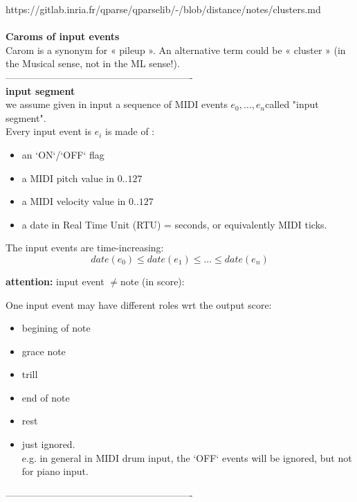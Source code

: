https://gitlab.inria.fr/qparse/qparselib/-/blob/distance/notes/clusters.md\\\\

\textbf{Caroms of input events}\\

Carom is a synonym for « pileup ». An alternative term could be « cluster » (in the Musical sense, not in the ML sense!).\\

----------------------------------------------------------\\

\textbf{input segment}\\

we assume given in input a sequence of MIDI events $e_0, \ldots, e_n$​​ called "input segment".\\

Every input event is $e_i$ is made of :
\begin{itemize}
	\item an `ON`/`OFF` flag
	\item a MIDI pitch value in $0..127$​
	\item a MIDI velocity value in $0..127$
	\item a date in Real Time Unit (RTU) = seconds, or equivalently MIDI ticks.\\
\end{itemize}

The input events are time-increasing:
$$ date(e_0) \leq  date(e_1) \leq \ldots \leq date(e_n)$$

\textbf{attention:} input event $\neq$​ note (in score):

One input event may have different roles wrt the output score:
\begin{itemize}
	\item begining of note
	\item grace note
	\item trill
	\item end of note
	\item rest
	\item just ignored.\\e.g. in general in MIDI drum input, the `OFF` events will be ignored, but not for piano input.\\
\end{itemize}

----------------------------------------------------------\\

